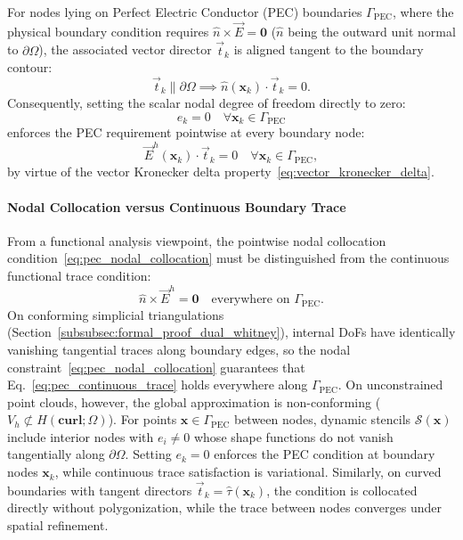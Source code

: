 \documentclass[preprint,12pt]{elsarticle}
\begin{document}
For nodes lying on Perfect Electric Conductor (PEC) boundaries $\Gamma_{\text{PEC}}$, where the physical boundary condition requires $\hat{n} \times \vec{E} = \mathbf{0}$ ($\hat{n}$ being the outward unit normal to $\partial\Omega$), the associated vector director $\vec{t}_k$ is aligned tangent to the boundary contour:
\begin{equation}
    \vec{t}_k \parallel \partial\Omega \implies \hat{n}(\mathbf{x}_k) \cdot \vec{t}_k = 0.
\end{equation}
Consequently, setting the scalar nodal degree of freedom directly to zero:
\begin{equation}
    e_k = 0 \quad \forall \mathbf{x}_k \in \Gamma_{\text{PEC}}
    \label{eq:pec_dirichlet_homog}
\end{equation}
enforces the PEC requirement pointwise at every boundary node:
\begin{equation}
    \vec{E}^h(\mathbf{x}_k) \cdot \vec{t}_k = 0 \quad \forall \mathbf{x}_k \in \Gamma_{\text{PEC}},
    \label{eq:pec_nodal_collocation}
\end{equation}
by virtue of the vector Kronecker delta property~\eqref{eq:vector_kronecker_delta}.

\paragraph{Nodal Collocation versus Continuous Boundary Trace}
From a functional analysis viewpoint, the pointwise nodal collocation condition~\eqref{eq:pec_nodal_collocation} must be distinguished from the continuous functional trace condition:
\begin{equation}
    \hat{n} \times \vec{E}^h = \mathbf{0} \quad \text{everywhere on } \Gamma_{\text{PEC}}.
    \label{eq:pec_continuous_trace}
\end{equation}
On conforming simplicial triangulations (Section~\ref{subsubsec:formal_proof_dual_whitney}), internal DoFs have identically vanishing tangential traces along boundary edges, so the nodal constraint~\eqref{eq:pec_nodal_collocation} guarantees that Eq.~\eqref{eq:pec_continuous_trace} holds everywhere along $\Gamma_{\text{PEC}}$. On unconstrained point clouds, however, the global approximation is non-conforming ($V_h \not\subset H(\mathbf{curl}; \Omega)$). For points $\mathbf{x} \in \Gamma_{\text{PEC}}$ between nodes, dynamic stencils $\mathcal{S}(\mathbf{x})$ include interior nodes with $e_i \neq 0$ whose shape functions do not vanish tangentially along $\partial\Omega$. Setting $e_k = 0$ enforces the PEC condition at boundary nodes $\mathbf{x}_k$, while continuous trace satisfaction is variational. Similarly, on curved boundaries with tangent directors $\vec{t}_k = \hat{\tau}(\mathbf{x}_k)$, the condition is collocated directly without polygonization, while the trace between nodes converges under spatial refinement.
\end{document}
